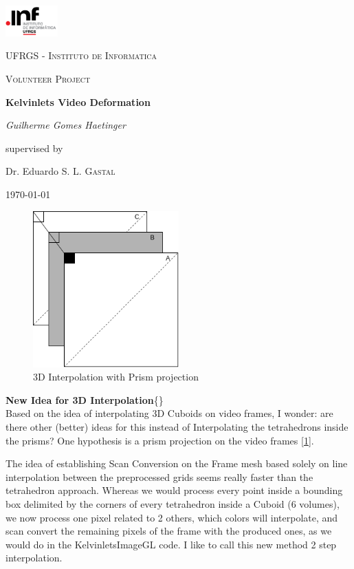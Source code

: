 \documentclass[12pt, a4paper]{report}
\newenvironment{loggentry}[2]%
{\noindent\textbf{#2}\newline\{\marginnote{#1}\}\newline\\}{\vspace{1.0cm}}
\begin{document}
\begin{titlepage}
	\centering
	\includegraphics[width=0.15\textwidth]{res/inf.png}\par\vspace{1cm}
	{\scshape\LARGE UFRGS - Instituto de Informatica \par}
	\vspace{1cm}
	{\scshape\Large Volunteer Project\par}
	\vspace{1.5cm}
	{\huge\bfseries Kelvinlets Video Deformation\par}
	\vspace{2cm}
	{\Large\itshape Guilherme Gomes Haetinger\par}
	\vfill
	supervised by\par
	Dr. Eduardo S. L. \textsc{Gastal}

	\vfill

	{\large \today\par}
\end{titlepage}

\begin{figure}
	\includegraphics[width=0.5\textwidth]{./res/interpolationExample.png}
	\caption{3D Interpolation with Prism projection}
	\label{fig:newInterp}
\end{figure}

\begin{loggentry}{28-05-2019}{New Idea for 3D Interpolation}
	Based on the idea of interpolating 3D Cuboids on video frames, I wonder: are there other (better) ideas for this instead of Interpolating the tetrahedrons inside the prisms? One hypothesis is a prism projection on the video frames [\ref{fig:newInterp}].	

	The idea of establishing Scan Conversion on the Frame mesh based solely on line interpolation between the preprocessed grids seems really faster than the tetrahedron approach. Whereas we would process every point inside a bounding box delimited by the corners of every tetrahedron inside a Cuboid (6 volumes), we now process one pixel related to 2 others, which colors will interpolate, and scan convert the remaining pixels of the frame with the produced ones, as we would do in the KelvinletsImageGL code. I like to call this new method 2 step interpolation.  
\end{loggentry}
\end{document}
